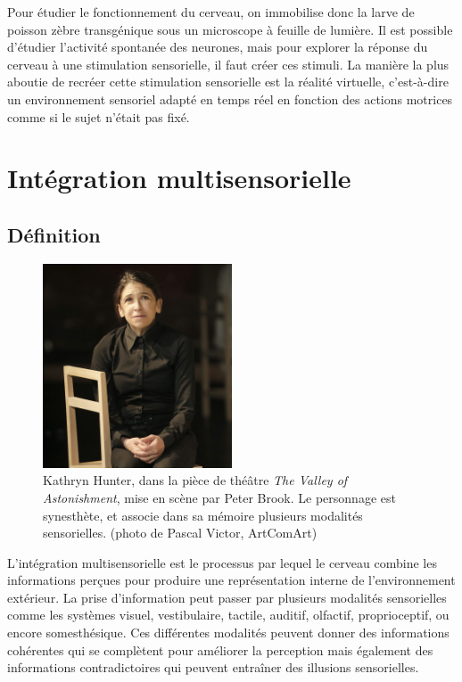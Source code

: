 Pour étudier le fonctionnement du cerveau, on immobilise donc la larve de poisson zèbre transgénique sous un microscope à feuille de lumière. Il est possible d'étudier l'activité spontanée des neurones, mais pour explorer la réponse du cerveau à une stimulation sensorielle, il faut créer ces stimuli. La manière la plus aboutie de recréer cette stimulation sensorielle est la réalité virtuelle, c'est-à-dire un environnement sensoriel adapté en temps réel en fonction des actions motrices comme si le sujet n'était pas fixé.


\section{Intégration multisensorielle}

\subsection{Définition}

\begin{figure}
  \centering
  \includegraphics[width=0.5\textwidth]{./files/Kathryn-Hunter_Peter-Brook_valley-of-astonishement.jpg}
  \caption{Kathryn Hunter, dans la pièce de théâtre \emph{The Valley of Astonishment}, mise en scène par Peter Brook. Le personnage est synesthète, et associe dans sa mémoire plusieurs modalités sensorielles. (photo de Pascal Victor, ArtComArt)}
  \end{figure}

L'intégration multisensorielle est le processus par lequel le cerveau combine les informations perçues pour produire une représentation interne de l'environnement extérieur. La prise d'information peut passer par plusieurs modalités sensorielles comme les systèmes visuel, vestibulaire, tactile, auditif, olfactif, proprioceptif, ou encore somesthésique. Ces différentes modalités peuvent donner des informations cohérentes qui se complètent pour améliorer la perception mais également des informations contradictoires qui peuvent entraîner des illusions sensorielles.


